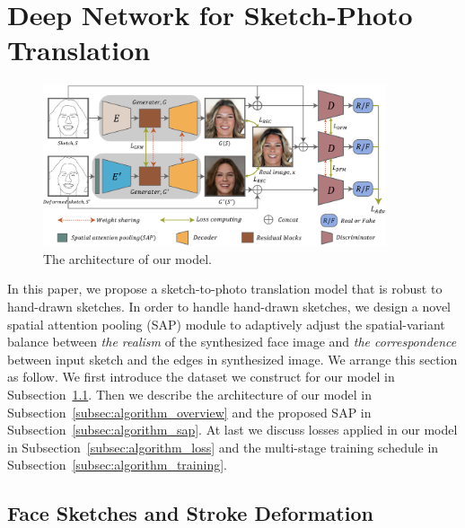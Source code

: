 
\section{Deep Network for Sketch-Photo Translation}
\label{sec:network}

\begin{figure}
	\includegraphics[width=0.9\textwidth]{figs/architecture}
	\caption{The architecture of our model.}
	\label{fig:architecture}
\end{figure}
%
In this paper, we propose a sketch-to-photo translation model that is robust to hand-drawn sketches. In order to handle hand-drawn sketches, we design a novel spatial attention pooling (SAP) module to adaptively adjust the spatial-variant balance between \textit{the realism} of the synthesized face image and \textit{the correspondence} between input sketch and the edges in synthesized image. 
We arrange this section as follow. We first introduce the dataset we construct for our model in Subsection~\ref{subsec:algorithm_data}.
Then we describe the architecture of our model in Subsection~\ref{subsec:algorithm_overview} and the proposed SAP in Subsection~\ref{subsec:algorithm_sap}.
At last we discuss losses applied in our model in Subsection~\ref{subsec:algorithm_loss} and the multi-stage training schedule in Subsection~\ref{subsec:algorithm_training}.




\subsection{Face Sketches and Stroke Deformation}
\label{subsec:algorithm_data}



